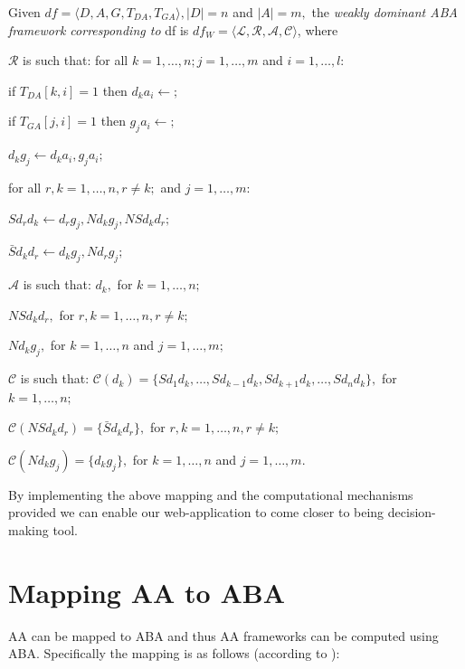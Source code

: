 \begin{defn} Given $df=\langle D, A, G, T_{DA}, T_{GA} \rangle, |D| = n$ and $|A|=m,$ the \emph{weakly dominant ABA framework corresponding to} df is $df_W=\langle \mathcal{L}, \mathcal{R}, \mathcal{A}, \mathcal{C} \rangle$, where
\begin{itemize*}
\item $\mathcal{R}$ is such that: for all $k=1,\ldots,n; j=1,\ldots,m$ and $i=1,\ldots,l$:
\begin{itemize*}
\item if $T_{DA}[k,i]=1$ then $d_ka_i \leftarrow;$
\item if $T_{GA}[j,i]=1$ then $g_ja_i \leftarrow;$
\item $d_kg_j \leftarrow d_ka_i,g_ja_i;$

for all $r,k=1,\ldots,n,r \neq k;$ and $j=1,\ldots,m$:
\item $Sd_rd_k \leftarrow d_rg_j,Nd_kg_j,NSd_kd_r;$
\item $\bar{S}d_kd_r \leftarrow d_kg_j,Nd_rg_j;$
\end{itemize*}
\item $\mathcal{A}$ is such that: $d_k,$ for $k=1,\ldots,n;$

$NSd_kd_r,$ for $r,k=1,\ldots,n,r \neq k;$

$Nd_kg_j,$ for $k=1,\ldots,n$ and $j=1,\ldots,m;$
\item $\mathcal{C}$ is such that: $\mathcal{C}(d_k)=\{Sd_1d_k,\ldots,Sd_{k-1}d_k,Sd_{k+1}d_k,\ldots,Sd_nd_k\},$ for $k=1,\ldots,n;$

$\mathcal{C}(NSd_kd_r)=\{\bar{S}d_kd_r\},$ for $r,k=1,\ldots,n,r \neq k;$

$\mathcal{C}(Nd_kg_j)=\{d_kg_j\},$ for $k=1,\ldots,n$ and $j=1,\ldots,m$.
\end{itemize*}

\end{defn}

By implementing the above mapping and the computational mechanisms provided we can enable our web-application to come closer to being decision-making tool.

\section{Mapping AA to ABA} \label{subsec:mapping}
AA can be mapped to ABA and thus AA frameworks can be computed using ABA. Specifically the mapping is as follows (according to \cite{AAmapping}):
\newline

